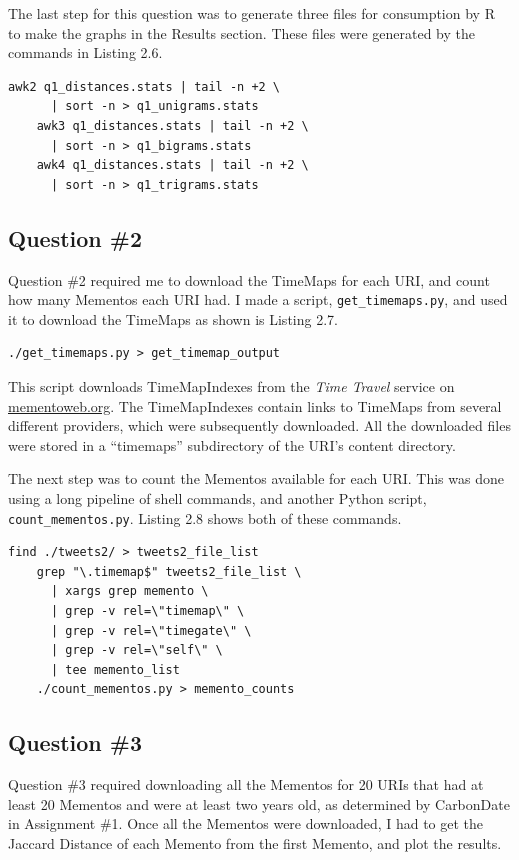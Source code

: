 \documentclass[a4paper,12pt]{article}
\begin{document}
The last step for this question was to generate three files for consumption by R to make the graphs in the
Results section. These files were generated by the commands in Listing 2.6.

\begin{lstlisting}[basicstyle=\ttfamily,caption={Generating R Input Files}]
    awk2 q1_distances.stats | tail -n +2 \
      | sort -n > q1_unigrams.stats
    awk3 q1_distances.stats | tail -n +2 \
      | sort -n > q1_bigrams.stats
    awk4 q1_distances.stats | tail -n +2 \
      | sort -n > q1_trigrams.stats
\end{lstlisting}

\subsection{Question \#2}
Question \#2 required me to download the TimeMaps for each URI, and count how many Mementos each URI had.
I made a script, \texttt{get\_timemaps.py}, and used it to download the TimeMaps as shown is Listing 2.7.

\begin{lstlisting}[basicstyle=\ttfamily,caption={Downloading TimeMaps}]
    ./get_timemaps.py > get_timemap_output
\end{lstlisting}

This script downloads TimeMapIndexes from the \emph{Time Travel} service on \url{mementoweb.org}. The
TimeMapIndexes contain links to TimeMaps from several different providers, which were subsequently
downloaded. All the downloaded files were stored in a ``timemaps'' subdirectory of the URI's content
directory.

The next step was to count the Mementos available for each URI. This was done using a long pipeline of
shell commands, and another Python script, \texttt{count\_mementos.py}. Listing 2.8 shows both of these
commands.

\begin{lstlisting}[basicstyle=\ttfamily,caption={Counting Mementos}]
    find ./tweets2/ > tweets2_file_list
    grep "\.timemap$" tweets2_file_list \
      | xargs grep memento \
      | grep -v rel=\"timemap\" \
      | grep -v rel=\"timegate\" \
      | grep -v rel=\"self\" \
      | tee memento_list
    ./count_mementos.py > memento_counts
\end{lstlisting}

\subsection{Question \#3}
Question \#3 required downloading all the Mementos for 20 URIs that had at least 20 Mementos and were at
least two years old, as determined by CarbonDate in Assignment \#1. Once all the Mementos were downloaded,
I had to get the Jaccard Distance of each Memento from the first Memento, and plot the results.
\end{document}
